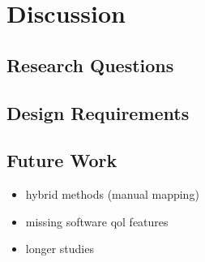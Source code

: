 \section{Discussion}\label{sec:discussion}

\subsection{Research Questions}

\subsection{Design Requirements}\label{subsec:discussion_design_requirements}

\subsection{Future Work}

\begin{itemize}
    \item hybrid methods (manual mapping)
    \item missing software qol features
    \item longer studies
\end{itemize}
